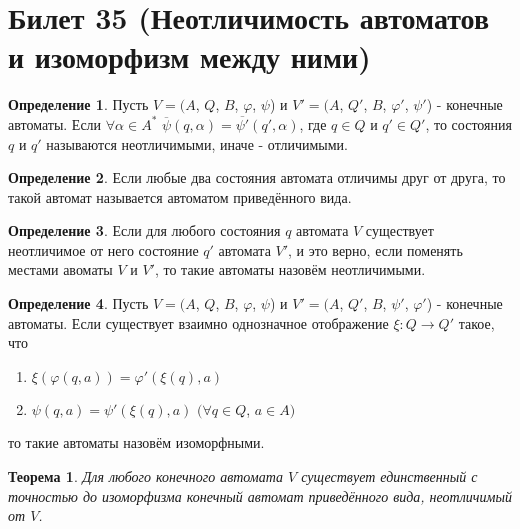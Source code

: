 \documentclass[a4paper, 12pt]{article}
\renewcommand{\phi}{\varphi}
\theoremstyle{definition}
\newtheorem*{definition}{Определение}
\theoremstyle{plain}
\newtheorem*{theorem}{Теорема}
\theoremstyle{remark}
\begin{document}
  \section{Билет 35 (Неотличимость автоматов и изоморфизм между ними)}
  \begin{definition}
    Пусть $V=(A$, $Q$, $B$, $\phi$, $\psi$) и $V'=(A$, $Q'$, $B$, $\phi'$, $\psi'$) - конечные автоматы. Если $\forall\alpha\in A^*$ $\overline{\psi}(q, \alpha)=\overline{\psi'}(q', \alpha)$, где $q\in Q$ и $q'\in Q'$, то состояния $q$ и $q'$ называются неотличимыми, иначе - отличимыми.
  \end{definition}
  \begin{definition}
    Если любые два состояния автомата отличимы друг от друга, то такой автомат называется автоматом приведённого вида.
  \end{definition}
  \begin{definition}
    Если для любого состояния $q$ автомата $V$ существует неотличимое от него состояние $q'$ автомата $V'$, и это верно, если поменять местами авоматы $V$ и $V'$, то такие автоматы назовём неотличимыми.
  \end{definition}
  \begin{definition}
    Пусть $V=(A$, $Q$, $B$, $\phi$, $\psi$) и $V'=(A$, $Q'$, $B$, $\psi'$, $\phi'$) - конечные автоматы. Если существует взаимно однозначное отображение $\xi:Q\rightarrow Q'$ такое, что
    \begin{enumerate}
      \item $\xi(\phi(q,a))=\phi'(\xi(q),a)$\\
      \item $\psi(q,a)=\psi'(\xi(q),a)$ $(\forall q\in Q$, $a\in A)$
    \end{enumerate}
    то такие автоматы назовём изоморфными.
  \end{definition}
  \begin{theorem}
    Для любого конечного автомата $V$ существует единственный с точностью до изоморфизма конечный автомат приведённого вида, неотличимый от $V$.
  \end{theorem}
\end{document}
